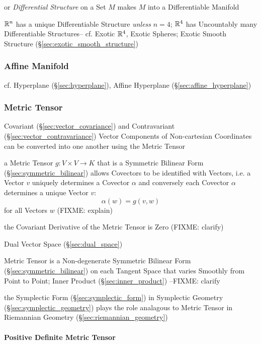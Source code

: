 or \emph{Differential Structure} on a Set $M$ makes $M$ into a Differentiable
Manifold

$\mathbb{R}^n$ has a unique Differentiable Structure \emph{unless} $n = 4$;
$\mathbb{R}^4$ has Uncountably many Differentiable Structures-- cf. Exotic
$\mathbb{R}^4$, Exotic Spheres; Exotic Smooth Structure
(\S\ref{sec:exotic_smooth_structure})



\subsubsection{Affine Manifold}\label{sec:affine_manifold}

cf. Hyperplane (\S\ref{sec:hyperplane}), Affine Hyperplane
(\S\ref{sec:affine_hyperplane})



\subsubsection{Metric Tensor}\label{sec:metric_tensor}

Covariant (\S\ref{sec:vector_covariance}) and Contravariant
(\S\ref{sec:vector_contravariance}) Vector Components of Non-cartesian
Coordinates can be converted into one another using the Metric Tensor

a Metric Tensor $g : V \times V \rightarrow K$ that is a Symmetric Bilinear Form
(\S\ref{sec:symmetric_bilinear}) allows Covectors to be identified with Vectors,
i.e. a Vector $v$ uniquely determines a Covector $\alpha$ and conversely each
Covector $\alpha$ determines a unique Vector $v$:
\[
  \alpha (w) = g (v,w)
\]
for all Vectors $w$
(FIXME: explain)

the Covariant Derivative of the Metric Tensor is Zero (FIXME: clarify)

Dual Vector Space (\S\ref{sec:dual_space})

Metric Tensor is a Non-degenerate Symmetric Bilinear Form
(\S\ref{sec:symmetric_bilinear}) on each Tangent Space that varies Smoothly from
Point to Point; Inner Product (\S\ref{sec:inner_product}) --FIXME: clarify

the Symplectic Form (\S\ref{sec:symplectic_form}) in Symplectic Geometry
(\S\ref{sec:symplectic_geometry}) plays the role analagous to Metric Tensor in
Riemannian Geometry (\S\ref{sec:riemannian_geometry})



\paragraph{Positive Definite Metric Tensor}
\label{sec:positive_definite_metric_tensor}\hfill

